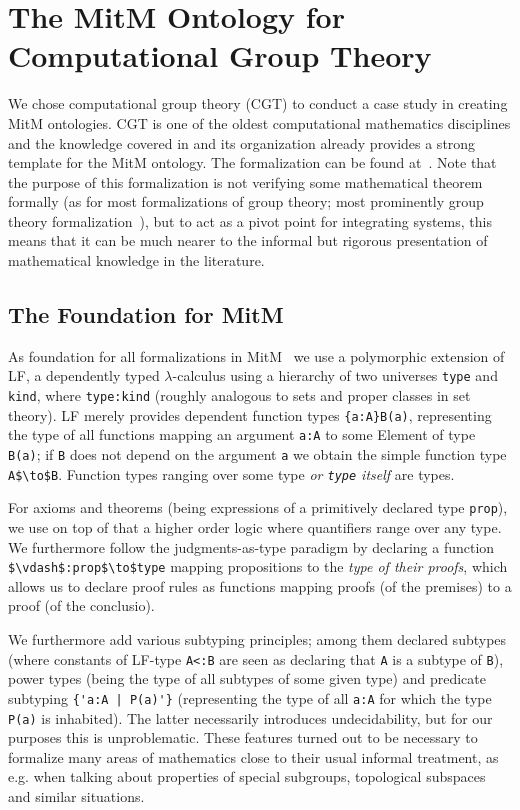 \section{The MitM Ontology for Computational Group Theory}\label{sec:cgt}

We chose computational group theory (CGT) to conduct a case study in creating MitM ontologies. CGT is one of the oldest computational mathematics disciplines and the knowledge covered in \GAP and its organization already provides a strong template for the MitM ontology. The formalization can be found at~\cite{mitm:groups:on}. Note that the purpose of this formalization is not verifying some mathematical theorem formally (as for most formalizations of group theory; most prominently group theory formalization~\cite{Gonthier+:mcpoot13}), but to act as a pivot point for integrating systems, this means that it can be much nearer to the informal but rigorous presentation of mathematical knowledge in the literature.

\subsection{The Foundation for MitM}
As foundation for all formalizations in MitM~\cite{mitm:fondation:on} we use a polymorphic extension of LF, a dependently typed $\lambda$-calculus using a hierarchy
of two universes \lstinline|type| and \lstinline|kind|, where \lstinline|type:kind| (roughly analogous to sets and proper classes in set theory). 
LF merely provides dependent function types \lstinline|{a:A}B(a)|, representing the type of all functions mapping an argument \lstinline|a:A| to some Element of type \lstinline|B(a)|; if \lstinline|B| does not depend on the argument \lstinline|a| we obtain the simple function type \lstinline[mathescape]|A$\to$B|. 
Function types ranging over some type \emph{or \lstinline|type| itself} are types.

For axioms and theorems (being expressions of a primitively declared type \lstinline|prop|), we use on top of that a higher order logic where quantifiers range over any type. We furthermore follow the judgments-as-type paradigm by declaring a function \lstinline[mathescape]|$\vdash$:prop$\to$type| mapping propositions to the \emph{type of their proofs}, which allows us to declare proof rules as functions mapping proofs (of the premises) to a proof (of the conclusio).

We furthermore add various subtyping principles; among them declared subtypes (where constants of LF-type \lstinline|A<:B| are seen as declaring that \lstinline|A| is a subtype of \lstinline|B|), power types (being the type of all subtypes of some given type) and predicate subtyping \lstinline?{'a:A | P(a)'}? (representing the type of all \lstinline|a:A| for which the type \lstinline|P(a)| is inhabited). The latter necessarily introduces undecidability, but for our purposes this is unproblematic. These features turned out to be necessary to formalize many areas of mathematics close to their usual informal treatment, as e.g. when talking about properties of special subgroups, topological subspaces and similar situations.

